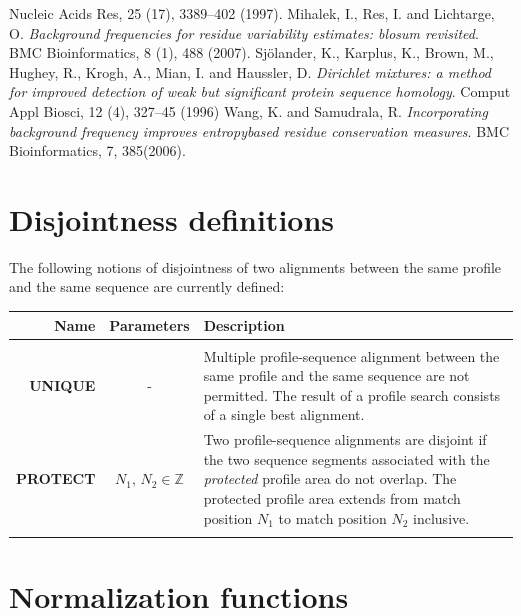 \documentclass[a4paper,10pt,twoside]{scrartcl}
\begin{document}
\begin{thebibliography}{9}
   Nucleic Acids Res, 25 (17), 3389–402 (1997).
   Mihalek, I., Res, I. and Lichtarge, O. 
   \emph{Background frequencies for residue variability estimates: blosum revisited}.
   BMC Bioinformatics, 8 (1), 488 (2007).
   Sj\"{o}lander, K., Karplus, K., Brown, M., Hughey, R., Krogh, A., Mian, I. and Haussler, D.
   \emph{Dirichlet mixtures: a method for improved detection of weak but significant protein sequence homology}.
   Comput Appl Biosci, 12 (4), 327–45 (1996)   
   Wang, K. and Samudrala, R.
   \emph{Incorporating background frequency improves entropybased residue conservation measures}.
   BMC Bioinformatics, 7, 385(2006).
\end{thebibliography}

\appendix
 \section{Disjointness definitions} \label{Disjointness definitions}
 
  The following notions of disjointness of two alignments between the same profile and the same sequence are currently defined:
  \begin{center}
  \begin{tabular}{rcp{12cm}}
  Name & Parameters & Description\\
  \hline \\
  \textbf{UNIQUE} & - & Multiple profile-sequence alignment between the same
		      profile and the same sequence are not permitted. The
		      result of a profile search consists of a single best
		      alignment. \\
  \textbf{PROTECT} & $N_1, \, N_2 \in \mathbb{Z}$ & Two profile-sequence alignments are disjoint if the
            two sequence segments associated with the \emph{protected}
            profile area do not overlap. The protected profile
            area extends from match position $N_1$ to match position
            $N_2$ inclusive.\\
  \hline\\
  \end{tabular}
  \end{center}

  \section{Normalization functions} \label{Normalization functions}
\end{document}
